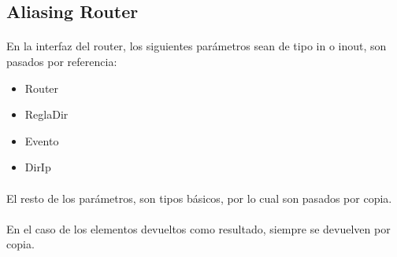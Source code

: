 \subsection*{Aliasing Router}

\paragraph{}
En la interfaz del router, los siguientes par\'ametros sean de tipo in o inout, son pasados por referencia:
\begin{itemize}
 \item Router
 \item ReglaDir
 \item Evento
 \item DirIp 
\end{itemize}

\paragraph{}
El resto de los par\'ametros, son tipos b\'asicos, por lo cual son pasados por copia.

\paragraph{}
En el caso de los elementos devueltos como resultado, siempre se devuelven por copia.
